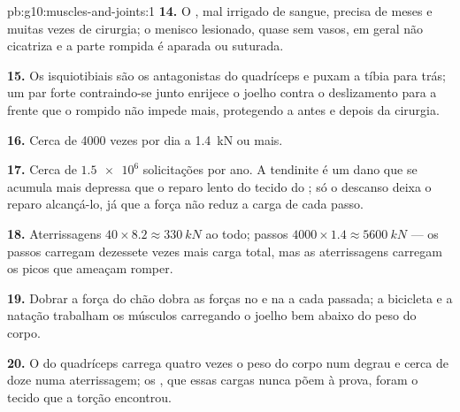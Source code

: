 \begin{solution}{pb:g10:muscles-and-joints:1}
\textbf{14.} O , mal irrigado de sangue, precisa de meses e
muitas vezes de cirurgia; o menisco lesionado,  quase sem
vasos, em geral não cicatriza e a parte rompida é aparada ou suturada.

\textbf{15.} Os isquiotibiais são os antagonistas do quadríceps e puxam
a tíbia para trás; um par forte contraindo-se junto enrijece o joelho
contra o deslizamento para a frente que o  rompido não impede
mais, protegendo a  antes e depois da cirurgia.

\textbf{16.} Cerca de 4000 vezes por dia a \qty{1.4}{kN} ou mais.

\textbf{17.} Cerca de $\num{1.5e6}$ solicitações por ano. A tendinite é
um dano que se acumula mais depressa que o reparo lento do tecido do
; só o descanso deixa o reparo alcançá-lo, já que a força não
reduz a carga de cada passo.

\textbf{18.} Aterrissagens $40 \times 8.2 \approx \qty{330}{kN}$ ao
todo; passos $4000 \times 1.4 \approx \qty{5600}{kN}$ --- os passos
carregam dezessete vezes mais carga total, mas as aterrissagens carregam
os picos que ameaçam romper.

\textbf{19.} Dobrar a força do chão dobra as forças no  e na
 a cada passada; a bicicleta e a natação trabalham os
músculos carregando o joelho bem abaixo do peso do corpo.

\textbf{20.} O  do quadríceps carrega quatro vezes o peso do
corpo num degrau e cerca de doze numa aterrissagem; os , que
essas cargas nunca põem à prova, foram o tecido que a torção encontrou.
\end{solution}
